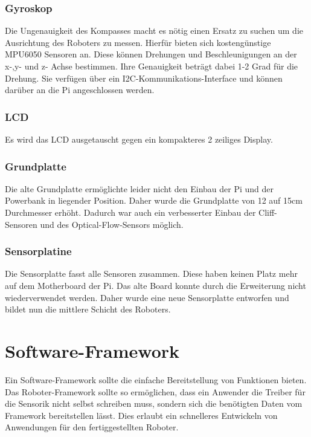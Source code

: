 \documentclass[a4paper,cleardoubleempty,BCOR1cm]{book}
\begin{document}
\subsubsection{Gyroskop}
Die Ungenauigkeit des Kompasses macht es nötig einen Ersatz zu suchen um die Ausrichtung des Roboters zu messen. Hierfür bieten sich kostengünstige MPU6050 Sensoren an. Diese können Drehungen und Beschleunigungen an der x-,y- und z- Achse bestimmen. Ihre Genauigkeit beträgt dabei 1-2 Grad für die Drehung. Sie verfügen über ein I2C-Kommunikations-Interface und können darüber an die Pi angeschlossen werden. 

\subsubsection{LCD}
Es wird das LCD ausgetauscht gegen ein kompakteres 2 zeiliges Display. 


\subsubsection{Grundplatte}
Die alte Grundplatte ermöglichte leider nicht den Einbau der Pi und der Powerbank in liegender Position. Daher wurde die Grundplatte von 12 auf 15cm Durchmesser erhöht. Dadurch war auch ein verbesserter Einbau der Cliff-Sensoren und des Optical-Flow-Sensors möglich. 

\subsubsection{Sensorplatine}
Die Sensorplatte fasst alle Sensoren zusammen. Diese haben keinen Platz mehr auf dem Motherboard der Pi. Das alte Board konnte durch die Erweiterung nicht wiederverwendet werden. Daher wurde eine neue Sensorplatte entworfen und bildet nun die mittlere Schicht des Roboters. 


\section{Software-Framework}
Ein Software-Framework sollte die einfache Bereitstellung von Funktionen bieten. Das Roboter-Framework sollte so ermöglichen, dass ein Anwender die Treiber für die Sensorik nicht selbst schreiben muss, sondern sich die benötigten Daten vom Framework bereitstellen lässt. Dies erlaubt ein schnelleres Entwickeln von Anwendungen für den fertiggestellten Roboter. 
\end{document}
